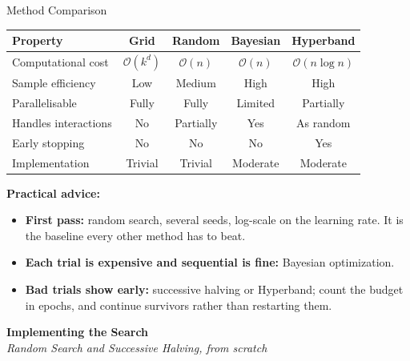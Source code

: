 \documentclass[aspectratio=169,11pt]{beamer}
\newcommand{\emphc}[1]{\textcolor{harvardcrimson}{#1}}
\begin{document}
\begin{frame}{Method Comparison}
\begin{center}
\renewcommand{\arraystretch}{1.3}
{\small
\begin{tabular}{@{}lcccc@{}}
\toprule
\textbf{Property} & \textbf{Grid} & \textbf{Random} & \textbf{Bayesian} & \textbf{Hyperband} \\
\midrule
Computational cost & $\mathcal{O}(k^d)$ & $\mathcal{O}(n)$ & $\mathcal{O}(n)$ & $\mathcal{O}(n \log n)$ \\
Sample efficiency & Low & Medium & \emphc{High} & High \\
Parallelisable & Fully & Fully & Limited & Partially \\
Handles interactions & No & Partially & \emphc{Yes} & As random \\
Early stopping & No & No & No & \emphc{Yes} \\
Implementation & Trivial & Trivial & Moderate & Moderate \\
\bottomrule
\end{tabular}
}
\end{center}

\vspace{-0.05cm}
\textbf{Practical advice:}
\begin{itemize}
    \item \textbf{First pass:} random search, several seeds, log-scale on the learning rate. It is the baseline every other method has to beat.
    \item \textbf{Each trial is expensive and sequential is fine:} Bayesian optimization.
    \item \textbf{Bad trials show early:} successive halving or Hyperband; count the budget in epochs, and continue survivors rather than restarting them.
\end{itemize}
\end{frame}


{
\begin{frame}[plain,c]
\begin{center}
{\Huge\bfseries Implementing the Search}\\[0.3cm]
{\large\itshape Random Search and Successive Halving, from scratch}
\end{center}
\end{frame}
}
\end{document}
